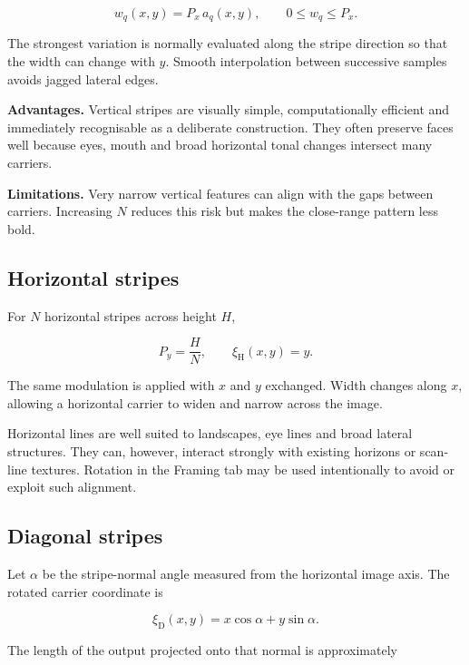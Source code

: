 \begin{equation}
w_q(x,y)=P_x\,a_q(x,y),
\qquad 0\le w_q\le P_x.
\label{eq:stripewidth}
\end{equation}

The strongest variation is normally evaluated along the stripe direction so that the width can change with $y$. Smooth interpolation between successive samples avoids jagged lateral edges.

\textbf{Advantages.} Vertical stripes are visually simple, computationally efficient and immediately recognisable as a deliberate construction. They often preserve faces well because eyes, mouth and broad horizontal tonal changes intersect many carriers.

\textbf{Limitations.} Very narrow vertical features can align with the gaps between carriers. Increasing $N$ reduces this risk but makes the close-range pattern less bold.

\subsection{Horizontal stripes}

For $N$ horizontal stripes across height $H$,

\begin{equation}
P_y=\frac{H}{N},
\qquad
\xi_{\mathrm{H}}(x,y)=y.
\end{equation}

The same modulation is applied with $x$ and $y$ exchanged. Width changes along $x$, allowing a horizontal carrier to widen and narrow across the image.

Horizontal lines are well suited to landscapes, eye lines and broad lateral structures. They can, however, interact strongly with existing horizons or scan-line textures. Rotation in the Framing tab may be used intentionally to avoid or exploit such alignment.

\subsection{Diagonal stripes}

Let $\alpha$ be the stripe-normal angle measured from the horizontal image axis. The rotated carrier coordinate is

\begin{equation}
\xi_{\mathrm{D}}(x,y)=x\cos\alpha+y\sin\alpha.
\label{eq:diagonalcoordinate}
\end{equation}

The length of the output projected onto that normal is approximately

